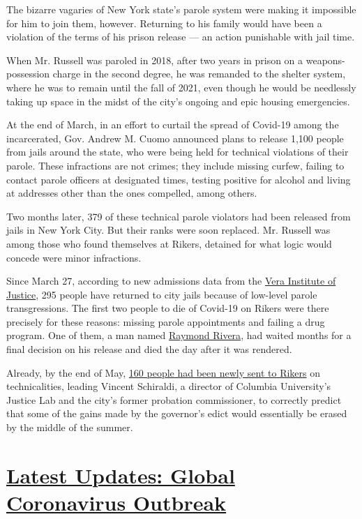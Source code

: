 The bizarre vagaries of New York state's parole system were making it
impossible for him to join them, however. Returning to his family would
have been a violation of the terms of his prison release --- an action
punishable with jail time.

When Mr. Russell was paroled in 2018, after two years in prison on a
weapons-possession charge in the second degree, he was remanded to the
shelter system, where he was to remain until the fall of 2021, even
though he would be needlessly taking up space in the midst of the city's
ongoing and epic housing emergencies.

At the end of March, in an effort to curtail the spread of Covid-19
among the incarcerated, Gov. Andrew M. Cuomo announced plans to release
1,100 people from jails around the state, who were being held for
technical violations of their parole. These infractions are not crimes;
they include missing curfew, failing to contact parole officers at
designated times, testing positive for alcohol and living at addresses
other than the ones compelled, among others.

Two months later, 379 of these technical parole violators had been
released from jails in New York City. But their ranks were soon
replaced. Mr. Russell was among those who found themselves at Rikers,
detained for what logic would concede were minor infractions.

Since March 27, according to new admissions data from the
\href{https://www.vera.org/}{Vera Institute of Justice}, 295 people have
returned to city jails because of low-level parole transgressions. The
first two people to die of Covid-19 on Rikers were there precisely for
these reasons: missing parole appointments and failing a drug program.
One of them, a man named
\href{https://www.nytimes3xbfgragh.onion/2020/04/09/nyregion/rikers-coronavirus-deaths-parolees.html}{Raymond
Rivera}, had waited months for a final decision on his release and died
the day after it was rendered.

Already, by the end of May,
\href{https://justicelab.columbia.edu/two-months-later}{160 people had
been newly sent to Rikers} on technicalities, leading Vincent Schiraldi,
a director of Columbia University's Justice Lab and the city's former
probation commissioner, to correctly predict that some of the gains made
by the governor's edict would essentially be erased by the middle of the
summer.

\hypertarget{latest-updates-global-coronavirus-outbreak}{%
\section{\texorpdfstring{\href{https://www.nytimes3xbfgragh.onion/2020/08/01/world/coronavirus-covid-19.html?action=click\&pgtype=Article\&state=default\&region=MAIN_CONTENT_1\&context=storylines_live_updates}{Latest
Updates: Global Coronavirus
Outbreak}}{Latest Updates: Global Coronavirus Outbreak}}\label{latest-updates-global-coronavirus-outbreak}}

